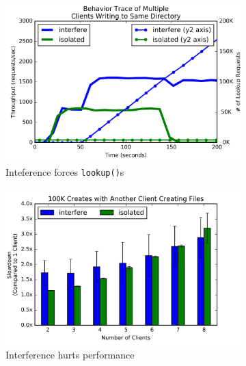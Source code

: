 \begin{figure}[t]
  \centering
  \begin{subfigure}[b]{.3\linewidth}
      \centering
      \includegraphics[width=1.0\linewidth]{graphs/behavior-interfere.png}
      \caption{Inteference forces \texttt{lookup()}s}
      \label{fig:interfere-a}
  \end{subfigure}
  \begin{subfigure}[b]{.3\linewidth}
      \centering
      \includegraphics[width=1.0\linewidth]{graphs/slowdown-interfere.png}
      \caption{Interference hurts performance}
      \label{fig:interfere-b}
  \end{subfigure}
  \begin{subfigure}[b]{.3\linewidth}
      \centering

\end{subfigure}
\end{figure}
